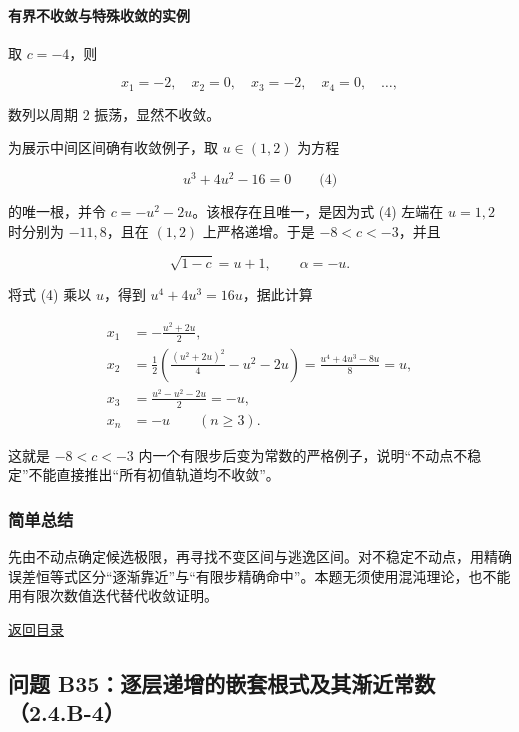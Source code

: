 \documentclass[11pt,a4paper]{article}
\begin{document}
\paragraph{有界不收敛与特殊收敛的实例}\label{ux6709ux754cux4e0dux6536ux655bux4e0eux7279ux6b8aux6536ux655bux7684ux5b9eux4f8b}

取 \(c=-4\)，则

\[
x_1=-2,\quad x_2=0,\quad x_3=-2,\quad x_4=0,\quad\ldots,
\]

数列以周期 \(2\) 振荡，显然不收敛。

为展示中间区间确有收敛例子，取 \(u\in(1,2)\) 为方程

\[
u^3+4u^2-16=0
\qquad\text{(4)}
\]

的唯一根，并令 \(c=-u^2-2u\)。该根存在且唯一，是因为式 (4) 左端在
\(u=1,2\) 时分别为 \(-11,8\)，且在 \((1,2)\) 上严格递增。于是
\(-8<c<-3\)，并且

\[
\sqrt{1-c}=u+1,\qquad \alpha=-u.
\]

将式 (4) 乘以 \(u\)，得到 \(u^4+4u^3=16u\)，据此计算

\[
\begin{aligned}
x_1&=-\frac{u^2+2u}{2},\\
x_2&=\frac12\left(\frac{(u^2+2u)^2}{4}-u^2-2u\right)
=\frac{u^4+4u^3-8u}{8}=u,\\
x_3&=\frac{u^2-u^2-2u}{2}=-u,\\
x_n&=-u\qquad(n\ge3).
\end{aligned}
\]

这就是 \(-8<c<-3\)
内一个有限步后变为常数的严格例子，说明``不动点不稳定''不能直接推出``所有初值轨道均不收敛''。

\subsubsection{简单总结}\label{ux7b80ux5355ux603bux7ed3-1}

先由不动点确定候选极限，再寻找不变区间与逃逸区间。对不稳定不动点，用精确误差恒等式区分``逐渐靠近''与``有限步精确命中''。本题无须使用混沌理论，也不能用有限次数值迭代替代收敛证明。

\noindent\hyperref[contents]{返回目录}

\subsection{问题
B35：逐层递增的嵌套根式及其渐近常数（2.4.B-4）}\label{ux95eeux9898-b35ux9010ux5c42ux9012ux589eux7684ux5d4cux5957ux6839ux5f0fux53caux5176ux6e10ux8fd1ux5e38ux65702.4.b-4}
\end{document}
